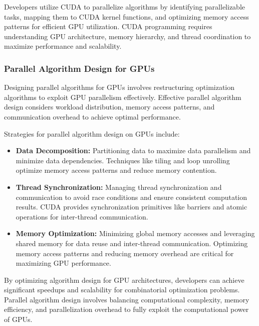 \documentclass[11pt]{report}
\begin{document}
            Developers utilize CUDA to parallelize algorithms by identifying parallelizable tasks, mapping them to CUDA kernel functions, and optimizing memory access patterns for efficient GPU utilization. CUDA programming requires understanding GPU architecture, memory hierarchy, and thread coordination to maximize performance and scalability.
            
        \subsubsection{Parallel Algorithm Design for GPUs}

            Designing parallel algorithms for GPUs involves restructuring optimization algorithms to exploit GPU parallelism effectively. Effective parallel algorithm design considers workload distribution, memory access patterns, and communication overhead to achieve optimal performance.
    
            Strategies for parallel algorithm design on GPUs include:

            \begin{itemize}
                \item \textbf{Data Decomposition:} Partitioning data to maximize data parallelism and minimize data dependencies. Techniques like tiling and loop unrolling optimize memory access patterns and reduce memory contention.
            
                \item \textbf{Thread Synchronization:} Managing thread synchronization and communication to avoid race conditions and ensure consistent computation results. CUDA provides synchronization primitives like barriers and atomic operations for inter-thread communication.
            
                \item \textbf{Memory Optimization:} Minimizing global memory accesses and leveraging shared memory for data reuse and inter-thread communication. Optimizing memory access patterns and reducing memory overhead are critical for maximizing GPU performance.
            \end{itemize}
            
            By optimizing algorithm design for GPU architectures, developers can achieve significant speedups and scalability for combinatorial optimization problems. Parallel algorithm design involves balancing computational complexity, memory efficiency, and parallelization overhead to fully exploit the computational power of GPUs.
\end{document}
